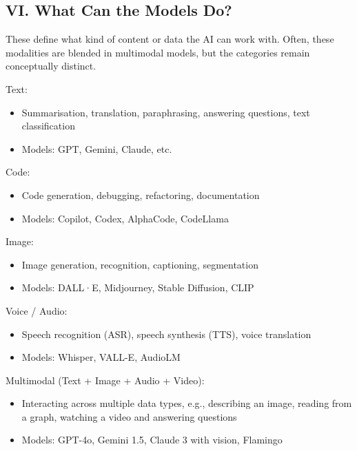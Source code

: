 \documentclass[
  10t,
]{article}
\providecommand{\tightlist}{%
  \setlength{\itemsep}{0pt}\setlength{\parskip}{0pt}}
\begin{document}
\subsection{VI. What Can the Models
Do?}\label{vi.-what-can-the-models-do}

These define what kind of content or data the AI can work with. Often,
these modalities are blended in multimodal models, but the categories
remain conceptually distinct.

Text:

\begin{itemize}
\tightlist
\item
  Summarisation, translation, paraphrasing, answering questions, text
  classification
\item
  Models: GPT, Gemini, Claude, etc.
\end{itemize}

Code:

\begin{itemize}
\tightlist
\item
  Code generation, debugging, refactoring, documentation
\item
  Models: Copilot, Codex, AlphaCode, CodeLlama
\end{itemize}

Image:

\begin{itemize}
\tightlist
\item
  Image generation, recognition, captioning, segmentation
\item
  Models: DALL·E, Midjourney, Stable Diffusion, CLIP
\end{itemize}

Voice / Audio:

\begin{itemize}
\tightlist
\item
  Speech recognition (ASR), speech synthesis (TTS), voice translation
\item
  Models: Whisper, VALL-E, AudioLM
\end{itemize}

Multimodal (Text + Image + Audio + Video):

\begin{itemize}
\tightlist
\item
  Interacting across multiple data types, e.g., describing an image,
  reading from a graph, watching a video and answering questions
\item
  Models: GPT-4o, Gemini 1.5, Claude 3 with vision, Flamingo
\end{itemize}
\end{document}

